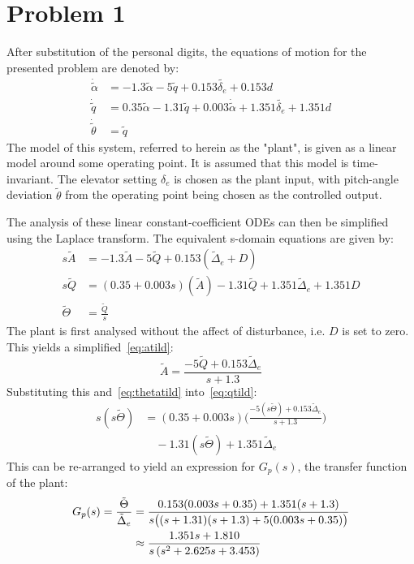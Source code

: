 \documentclass[conference,onecolumn,a4paper,11pt]{IEEEtran}
\begin{document}
\section{Problem 1}
After substitution of the personal digits, the equations of motion for the presented problem are denoted by: 
\begin{align*}
    \dot{\tilde{\alpha}} &= -1.3 \tilde{\alpha} -5 \tilde{q} + 0.153 \tilde{\delta_e} + 0.153d \\
    \dot{\tilde{q}} &= 0.35 \tilde{\alpha} -1.31\tilde{q} +0.003 \dot{\tilde{\alpha}} + 1.351\tilde{\delta_e} + 1.351d \\
    \dot{\tilde{\theta}} &= \tilde{q}
\end{align*}
The model of this system, referred to herein as the "plant", is given as a linear model around some operating point. It is assumed that this model is time-invariant. The elevator setting $\delta_e$ is chosen as the plant input, with pitch-angle deviation $\tilde{\theta}$ from the operating point being chosen as the controlled output.

The analysis of these linear constant-coefficient ODEs can then be simplified using the Laplace transform. The equivalent s-domain equations are given by:
\begin{align}
    s\tilde{A} &= -1.3\tilde{A} - 5\tilde{Q} + 0.153(\tilde{\Delta}_e + D) \label{eq:atild}\\
    s\tilde{Q} &= (0.35+ 0.003s)(\tilde{A}) -1.31\tilde{Q} + 1.351\tilde{\Delta}_e + 1.351D \label{eq:qtild} \\
    \tilde{\Theta} &= \frac{\tilde{Q}}{s} \label{eq:thetatild}
 \end{align}
The plant is first analysed without the affect of disturbance, i.e. $D$ is set to zero. This yields a simplified~\eqref{eq:atild}:
$$
    \tilde{A} = \frac{-5 \tilde{Q} + 0.153 \tilde{\Delta}_e}{s + 1.3}
$$
Substituting this and~\eqref{eq:thetatild} into~\eqref{eq:qtild}:
 $$
    \begin{aligned}
    s(s\tilde{\Theta}) &= (0.35 + 0.003s) \bigg(\frac{-5(s\tilde{\Theta}) + 0.153\tilde{\Delta}_e}{s + 1.3} \bigg) \\
    &\quad - 1.31(s\tilde{\Theta}) + 1.351 \tilde{\Delta}_e
    \end{aligned}
 $$
 This can be re-arranged to yield an expression for $G_p(s)$, the transfer function of the plant:
 \begin{align}
     G_p(s) = \frac{\tilde{\Theta}}{\tilde{\Delta}_e} &= \frac{0.153(0.003s + 0.35) + 1.351(s + 1.3)}{s\big((s + 1.31)(s + 1.3) + 5(0.003s + 0.35) \big)} \notag \\
      &\approx \frac{1.351s+1.810}{s\left(s^2+2.625s+3.453\right)} \label{eq:g_p(s)}
\end{align}
\end{document}
